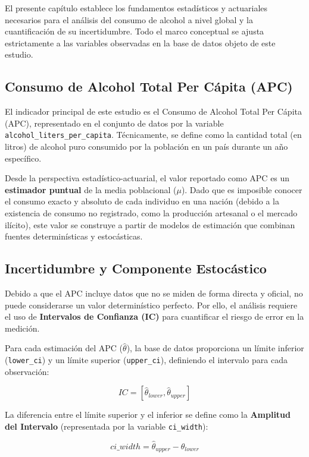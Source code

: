 \documentclass[oneside,11pt]{Latex/Classes/PhDthesisPSnPDF}
\begin{document}
El presente capítulo establece los fundamentos estadísticos y
actuariales necesarios para el análisis del consumo de alcohol a nivel
global y la cuantificación de su incertidumbre. Todo el marco conceptual
se ajusta estrictamente a las variables observadas en la base de datos
objeto de este estudio.

\subsection{Consumo de Alcohol Total Per Cápita (APC)}

El indicador principal de este estudio es el Consumo de Alcohol Total
Per Cápita (APC), representado en el conjunto de datos por la variable
\texttt{alcohol\_liters\_per\_capita}. Técnicamente, se define como la
cantidad total (en litros) de alcohol puro consumido por la población en
un país durante un año específico.

Desde la perspectiva estadístico-actuarial, el valor reportado como APC
es un \textbf{estimador puntual} de la media poblacional (\(\mu\)). Dado
que es imposible conocer el consumo exacto y absoluto de cada individuo
en una nación (debido a la existencia de consumo no registrado, como la
producción artesanal o el mercado ilícito), este valor se construye a
partir de modelos de estimación que combinan fuentes determinísticas y
estocásticas.

\subsection{Incertidumbre y Componente Estocástico}

Debido a que el APC incluye datos que no se miden de forma directa y
oficial, no puede considerarse un valor determinístico perfecto. Por
ello, el análisis requiere el uso de
\textbf{Intervalos de Confianza (IC)} para cuantificar el riesgo de
error en la medición.

Para cada estimación del APC (\(\hat{\theta}\)), la base de datos
proporciona un límite inferior (\texttt{lower\_ci}) y un límite superior
(\texttt{upper\_ci}), definiendo el intervalo para cada observación:

\[IC = [\hat{\theta}_{lower}, \hat{\theta}_{upper}]\]

La diferencia entre el límite superior y el inferior se define como la
\textbf{Amplitud del Intervalo} (representada por la variable
\texttt{ci\_width}):

\[ci\_width = \hat{\theta}_{upper} - \hat{\theta}_{lower}\]
\end{document}
